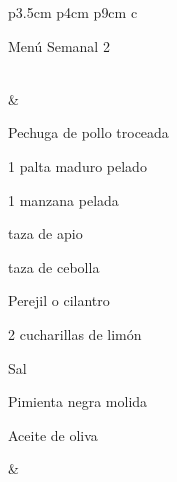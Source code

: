 \documentclass[menu.tex]{subfiles}
\begin{document}
            
            
            \begin{tabular} {p{3.5cm} p{4cm} p{9cm}}        
         { c }{\begin{LARGE}Menú Semanal 2\end{LARGE}}\\
        \hline
             & 
            \vspace{-2cm}
            \begin{compactitem} 
                \begin{scriptsize}
                    \item Pechuga de pollo troceada
                    \item 1 palta maduro pelado
                    \item 1 manzana pelada
                    \item {} taza de apio
                    \item {} taza de cebolla
                    \item Perejil o cilantro
                    \item 2 cucharillas de limón
                    \item Sal
                    \item Pimienta negra molida
                    \item Aceite de oliva
                \end{scriptsize}
            \end{compactitem}&

\end{tabular}
\end{document}

